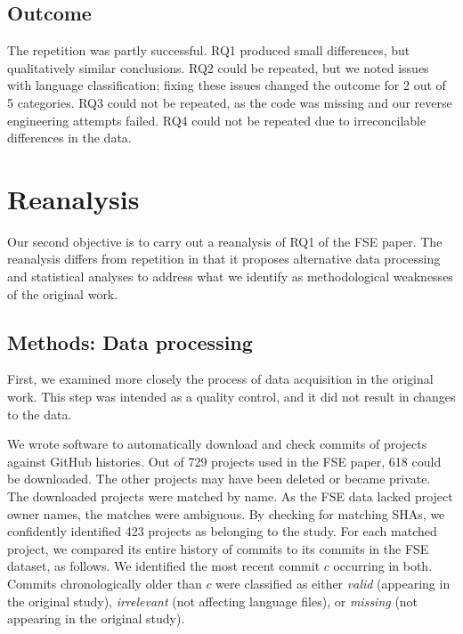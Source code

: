 \documentclass[acmsmall]{acmart}
\newcommand{\gh}{{GitHub}\xspace}
\begin{document}
\subsection{Outcome}

The repetition was partly successful. RQ1 produced small differences, but
qualitatively similar conclusions. RQ2 could be repeated, but we noted
issues with language classification; fixing these issues changed the outcome
for 2 out of 5 categories.  RQ3 could not be repeated, as the code was
missing and our reverse engineering attempts failed. RQ4 could not be
repeated due to irreconcilable differences in the data. 

\section{Reanalysis}

Our second objective is to carry out a reanalysis of RQ1 of the FSE paper.
The reanalysis differs from repetition in that it proposes alternative data
processing and statistical analyses to address what we identify as
methodological weaknesses of the original work.

\subsection{Methods: Data processing}\label{sec:methods:dataprocess}

First, we examined more closely the process of data acquisition in the
original work. This step was intended as a quality control, and it did not
result in changes to the data. 

We wrote software to automatically download and check commits of projects
against \gh histories. Out of 729 projects used in the FSE paper, 618 could
be downloaded. The other projects may have been deleted or became private. 
The downloaded projects were matched by name. As the FSE data lacked project
owner names, the matches were ambiguous.  By checking for matching SHAs, we
confidently identified 423 projects as belonging to the study.  
For each matched project, we compared its entire history of commits to its
commits in the FSE dataset, as follows. We identified the most recent commit
$c$ occurring in both. Commits chronologically older than $c$ were
classified as either {\it valid} (appearing in the original study), {\it
  irrelevant} (not affecting language files), or {\it missing} (not
appearing in the original study).  
\end{document}
